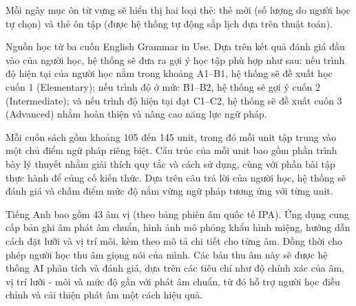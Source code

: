 \documentclass[a4paper,12pt]{extreport}
\begin{document}
\begin{description}
Mỗi ngày mục ôn từ vựng sẽ hiển thị hai loại thẻ: thẻ mới (số lượng do người học tự chọn) và thẻ ôn tập (được hệ thống tự động sắp lịch dựa trên thuật toán). 
    
    \item[Ngữ pháp (Grammar):] Nguồn học từ ba cuốn English Grammar in Use. Dựa trên kết quả đánh giá đầu vào của người học, hệ thống sẽ đưa ra gợi ý học tập phù hợp như sau: nếu trình độ hiện tại của người học nằm trong khoảng A1–B1, hệ thống sẽ đề xuất học cuốn 1 (Elementary); nếu trình độ ở mức B1–B2, hệ thống sẽ gợi ý cuốn 2 (Intermediate); và nếu trình độ hiện tại đạt C1–C2, hệ thống sẽ đề xuất cuốn 3 (Advanced) nhằm hoàn thiện và nâng cao năng lực ngữ pháp.  

Mỗi cuốn sách gồm khoảng 105 đến 145 unit, trong đó mỗi unit tập trung vào một chủ điểm ngữ pháp riêng biệt. Cấu trúc của mỗi unit bao gồm phần trình bày lý thuyết nhằm giải thích quy tắc và cách sử dụng, cùng với phần bài tập thực hành để củng cố kiến thức. Dựa trên câu trả lời của người học, hệ thống sẽ đánh giá và chấm điểm mức độ nắm vững ngữ pháp tương ứng với từng unit.
    
    \item[Phát âm (Pronunciation):] Tiếng Anh bao gồm 43 âm vị (theo bảng phiên âm quốc tế IPA). Ứng dụng cung cấp bản ghi âm phát âm chuẩn, hình ảnh mô phỏng khẩu hình miệng, hướng dẫn cách đặt lưỡi và vị trí môi, kèm theo mô tả chi tiết cho từng âm. Đồng thời cho phép người học thu âm giọng nói của mình. Các bản thu âm này sẽ được hệ thống AI phân tích và đánh giá, dựa trên các tiêu chí như độ chính xác của âm, vị trí lưỡi - môi và mức độ gần với phát âm chuẩn, từ đó hỗ trợ người học điều chỉnh và cải thiện phát âm một cách hiệu quả.
\end{description}
\end{document}

